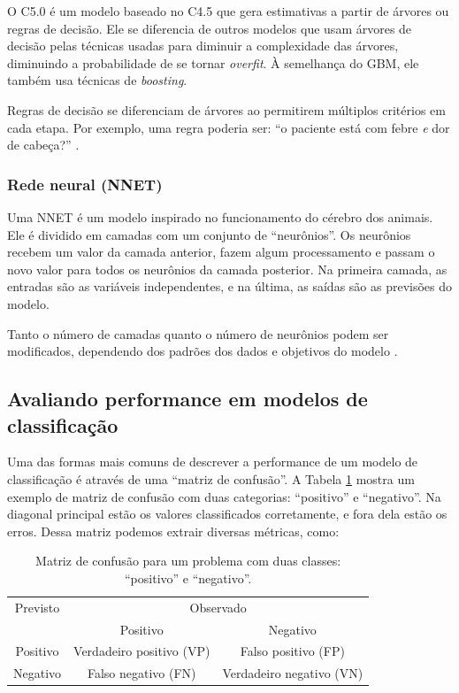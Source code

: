 \documentclass[a4paper,titlepage]{ppgi}\usepackage[]{graphicx}\usepackage[]{color}
\begin{document}
O C5.0 é um modelo baseado no C4.5 que gera estimativas a partir de árvores ou
regras de decisão. Ele se diferencia de outros modelos que usam árvores de
decisão pelas técnicas usadas para diminuir a complexidade das árvores,
diminuindo a probabilidade de se tornar \emph{overfit}. À semelhança do
\gls{GBM}, ele também usa técnicas de \emph{boosting}.

Regras de decisão se diferenciam de árvores ao permitirem múltiplos critérios
em cada etapa. Por exemplo, uma regra poderia ser: ``o paciente está com febre
\emph{e} dor de cabeça?'' \cite{Kuhn2013}.

\subsubsection{Rede neural (NNET)}

Uma \gls{NNET} é um modelo inspirado no funcionamento do cérebro dos animais.
Ele é dividido em camadas com um conjunto de ``neurônios''. Os neurônios
recebem um valor da camada anterior, fazem algum processamento e passam o novo
valor para todos os neurônios da camada posterior. Na primeira camada, as
entradas são as variáveis independentes, e na última, as saídas são as
previsões do modelo.

Tanto o número de camadas quanto o número de neurônios podem ser modificados,
dependendo dos padrões dos dados e objetivos do modelo \cite{Kuhn2013}.

\subsection{Avaliando performance em modelos de classificação}
\label{cap:fundamentacao:avaliando-modelos-de-classificacao}

\nocite{Ng2012}

Uma das formas mais comuns de descrever a performance de um modelo de
classificação é através de uma ``matriz de confusão''. A Tabela
\ref{table:exemplo-matriz-de-confusao} mostra um exemplo de matriz de confusão
com duas categorias: ``positivo'' e ``negativo''. Na diagonal principal estão
os valores classificados corretamente, e fora dela estão os erros. Dessa matriz
podemos extrair diversas métricas, como:

\begin{table}
\caption{Matriz de confusão para um problema com duas classes: ``positivo'' e
``negativo''.}
\label{table:exemplo-matriz-de-confusao}
\centering
\begin{tabular}{c c c}
  Previsto & \multicolumn{2}{c}{Observado} \\  \cline{2-3}
  & \multicolumn{1}{|c}{Positivo} & \multicolumn{1}{c|}{Negativo} \\
  \hline
  \multicolumn{1}{|c|}{Positivo} & Verdadeiro positivo (VP) & \multicolumn{1}{c|}{Falso positivo (FP)} \\
  \multicolumn{1}{|c|}{Negativo} & Falso negativo (FN) & \multicolumn{1}{c|}{Verdadeiro negativo (VN)} \\
  \hline
\end{tabular}
\end{table}
\end{document}
